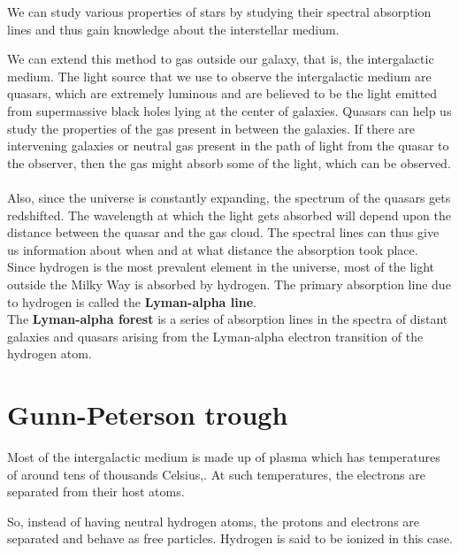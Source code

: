 \documentclass[a4,12pt,oneside]{report}
\begin{document}
	We can study various properties of stars by studying their spectral absorption lines and thus gain knowledge about the interstellar medium.
	
	We can extend this method to gas outside our galaxy, that is, the intergalactic medium. The light source that we use to 
	observe the intergalactic medium are quasars, which are extremely luminous and are believed to be the light emitted from 
	supermassive black holes lying at the center of galaxies. 
	Quasars can help us study the properties of the gas present in between the galaxies.
	If there are intervening galaxies or neutral gas present in the path of light from the quasar to the observer, then the gas might absorb some of the light,
	which can be observed.
	\\ \\
	Also, since the universe is constantly expanding, the spectrum of the quasars gets redshifted. The wavelength at which the light gets absorbed will depend upon the 
	distance between the quasar and the gas cloud. The spectral lines can thus give us information about when and at what distance the absorption took place. 
	\\
	Since hydrogen is the most prevalent element in the universe, most of the light outside the Milky Way is absorbed by hydrogen.
	The primary absorption line due to hydrogen is called the {\bf Lyman-alpha line}.
	\\
	The {\bf Lyman-alpha forest} is a series of absorption lines in the spectra of distant galaxies and quasars arising from the Lyman-alpha electron transition of the hydrogen atom.
	\section{Gunn-Peterson trough}
	Most of the intergalactic medium is made up of plasma which has temperatures of around tens of thousands Celsius,.
	At such temperatures, the electrons are separated from their host atoms.
	
	So, instead of having neutral hydrogen atoms, the protons and electrons are separated and behave as free particles. Hydrogen is said to be ionized in this case.
	
\end{document}
